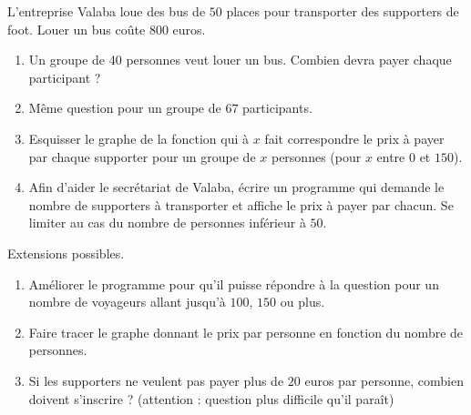 
\begin{exercice}\label{exosmath-0540}

    L'entreprise Valaba loue des bus de \( 50\) places pour transporter des supporters de foot. Louer un bus coûte \( 800\) euros.
    \begin{enumerate}
        \item
            Un groupe de 40 personnes veut louer un bus. Combien devra payer chaque participant ?
        \item
            Même question pour un groupe de \( 67\) participants.
        \item
            Esquisser le graphe de la fonction qui à \( x\) fait correspondre le prix à payer par chaque supporter pour un groupe de \( x\) personnes (pour \( x\) entre \( 0\) et \( 150\)).
        \item
            Afin d'aider le secrétariat de Valaba, écrire un programme qui demande le nombre de supporters à transporter et affiche le prix à payer par chacun. Se limiter au cas du nombre de personnes inférieur à \( 50\).
    \end{enumerate}
    
    Extensions possibles.
    \begin{enumerate}
        \item
            Améliorer le programme pour qu'il puisse répondre à la question pour un nombre de voyageurs allant jusqu'à \( 100\), \( 150\) ou plus.
        \item
            Faire tracer le graphe donnant le prix par personne en fonction du nombre de personnes.
        \item
            Si les supporters ne veulent pas payer plus de \( 20\) euros par personne, combien doivent s'inscrire ? (attention : question plus difficile qu'il paraît)
    \end{enumerate}

\end{exercice}
